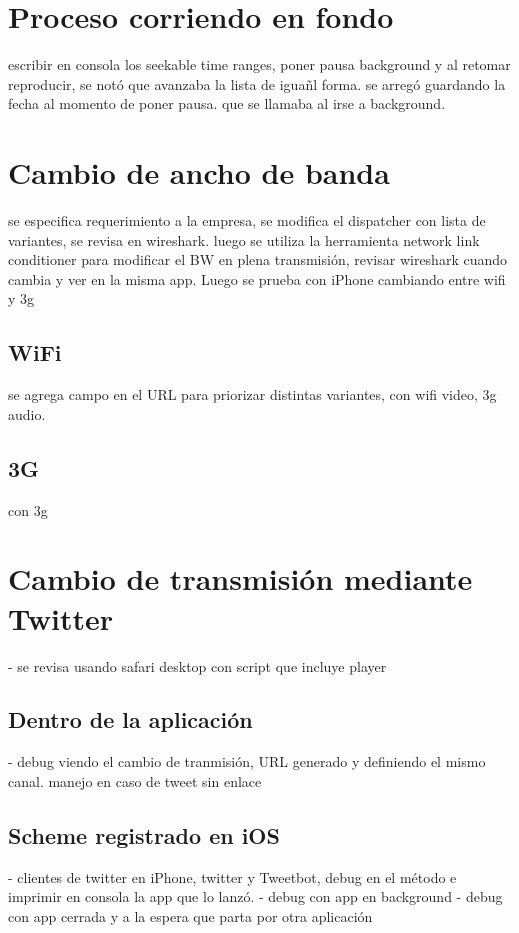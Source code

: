 \section{Proceso corriendo en fondo} %

escribir en consola los seekable time ranges, poner pausa background y al retomar reproducir, se notó que avanzaba la lista de iguañl forma. se arregó guardando la fecha al momento de poner pausa. que se llamaba al irse a background.

\section{Cambio de ancho de banda}

se especifica requerimiento a la empresa, se modifica el dispatcher con lista de variantes, se revisa en wireshark.
luego se utiliza la herramienta network link conditioner para modificar el BW en plena transmisión, revisar wireshark cuando cambia y ver en la misma app.
Luego se prueba con iPhone cambiando entre wifi y 3g

  \subsection{WiFi}
  se agrega campo en el URL para priorizar distintas variantes, con wifi video, 3g audio.
  \subsection{3G}
  con 3g 
\section{Cambio de transmisión mediante Twitter}
- se revisa usando safari desktop con script que incluye player


  \subsection{Dentro de la aplicación}
	- debug viendo el cambio de tranmisión, URL generado y definiendo el mismo canal. manejo en caso de tweet sin enlace
  \subsection{Scheme registrado en iOS}
	- clientes de twitter en iPhone, twitter y Tweetbot, debug en el método e imprimir en consola la app que lo lanzó.  
	- debug con app en background
	- debug con app cerrada y a la espera que parta por otra aplicación
  
